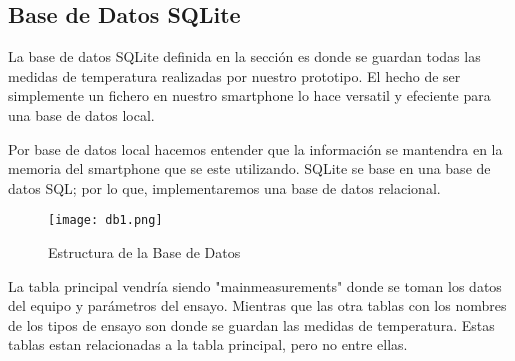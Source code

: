 \subsection{Base de Datos SQLite}

\par \noindent
La base de datos SQLite definida en la sección es donde se guardan todas las medidas de temperatura realizadas por nuestro prototipo. El hecho de ser simplemente un fichero en nuestro smartphone lo hace versatil y efeciente para una base de datos local. 


\par \noindent
Por base de datos local hacemos entender que la información se mantendra en la memoria del smartphone que se este utilizando. SQLite se base en una base de datos SQL; por lo que, implementaremos una base de datos relacional. 

\begin{figure}[H]
	\centering
	\texttt{[image: db1.png]}
	\caption{Estructura de la Base de Datos}
\end{figure}

\clearpage

\par \noindent
La tabla principal vendría siendo "mainmeasurements" donde se toman los datos del equipo y parámetros del ensayo. Mientras que las otra tablas con los nombres de los tipos de ensayo son donde se guardan las medidas de temperatura. Estas tablas estan relacionadas a la tabla principal, pero no entre ellas.